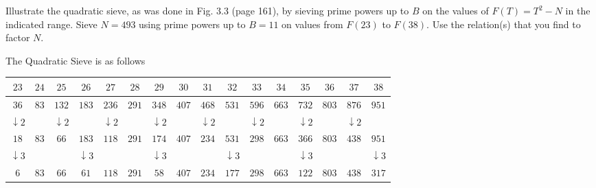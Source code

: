 \documentclass[12pt]{article}
\begin{document}
\thispagestyle{empty}

\problem Illustrate the quadratic sieve, as was done in Fig. 3.3 (page 161), by sieving prime powers up to $B$ on the values of $F(T)=T^2-N$ in the indicated range. Sieve $N=493$ using prime powers up to $B=11$ on values from $F(23)$ to $F(38)$. Use the relation(s) that you find to factor $N$.

\solution The Quadratic Sieve is as follows
\begin{table}[!ht]
    \centering
    \begin{tabular}{|cccccccccccccccc|}
        \hline
        $23$             & $24$ & $25$             & $26$           & $27$             & $28$           & $29$             & $30$            & $31$             & $32$             & $33$             & $34$           & $35$             & $36$            & $37$             & $38$           \\
        \hline
        $36$             & $83$ & $132$            & $183$          & $236$            & $291$          & $348$            & $407$           & $468$            & $531$            & $596$            & $663$          & $732$            & $803$           & $876$            & $951$          \\
        $\downarrow 2$   &      & $\downarrow 2$   &                & $\downarrow 2$   &                & $\downarrow 2$   &                 & $\downarrow 2$   &                  & $\downarrow 2$   &                & $\downarrow 2$   &                 & $\downarrow 2$   &                \\
        $18$             & $83$ & $66$             & $183$          & $118$            & $291$          & $174$            & $407$           & $234$            & $531$            & $298$            & $663$          & $366$            & $803$           & $438$            & $951$          \\
        $\downarrow 3$   &      &                  & $\downarrow 3$ &                  &                & $\downarrow 3$   &                 &                  & $\downarrow 3$   &                  &                & $\downarrow 3$   &                 &                  & $\downarrow 3$ \\
        $6$              & $83$ & $66$             & $61$           & $118$            & $291$          & $58$             & $407$           & $234$            & $177$            & $298$            & $663$          & $122$            & $803$           & $438$            & $317$          \\

\end{tabular}
\end{table}
\end{document}
